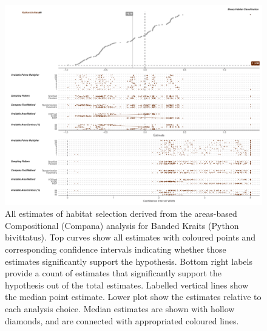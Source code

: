 \documentclass[10pt,a4paper]{article}
\begin{document}
\begin{figure}
\includegraphics[width=1\linewidth]{../../figures/specCurve_Python bivittatus_area} \caption{All estimates of habitat selection derived from the areas-based Compositional (Compana) analysis for Banded Kraits (Python bivittatus). Top curves show all estimates with coloured points and corresponding confidence intervals indicating whether those estimates significantly support the hypothesis. Bottom right labels provide a count of estimates that significantly support the hypothesis out of the total estimates. Labelled vertical lines show the median point estimate. Lower plot show the estimates relative to each analysis choice. Median estimates are shown with hollow diamonds, and are connected with appropriated coloured lines.}\label{fig:specCurveAreaPYBI}
\end{figure}
\end{document}
